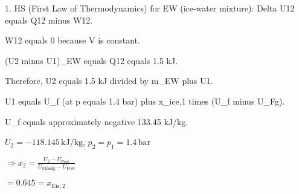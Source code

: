 1. HS (First Law of Thermodynamics) for EW (ice-water mixture):  
Delta U12 equals Q12 minus W12.  

W12 equals 0 because V is constant.  

(U2 minus U1)_EW equals Q12 equals 1.5 kJ.  

Therefore, U2 equals 1.5 kJ divided by m_EW plus U1.  

U1 equals U_f (at p equals 1.4 bar) plus x_ice,1 times (U_f minus U_Fg).  

U_f equals approximately negative 133.45 kJ/kg.

\( U_2 = -118.145 \, \text{kJ/kg} \), \( p_2 = p_1 = 1.4 \, \text{bar} \)  

\(\Rightarrow x_2 = \frac{U_2 - U_{\text{Fest}}}{U_{\text{Flüssig}} - U_{\text{Fest}}}\)  

\( = 0.645 = x_{\text{Eis},2} \)